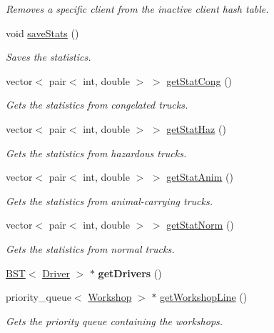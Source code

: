 \begin{DoxyCompactItemize}
\begin{DoxyCompactList}\small\item\em Removes a specific client from the inactive client hash table. \end{DoxyCompactList}\item 
void \hyperlink{class_company_aa5b12f509c71984f7346b14cff38ea50}{save\+Stats} ()
\begin{DoxyCompactList}\small\item\em Saves the statistics. \end{DoxyCompactList}\item 
vector$<$ pair$<$ int, double $>$ $>$ \hyperlink{class_company_a46ae11a39256db9dbf2941c58df579c5}{get\+Stat\+Cong} ()
\begin{DoxyCompactList}\small\item\em Gets the statistics from congelated trucks. \end{DoxyCompactList}\item 
vector$<$ pair$<$ int, double $>$ $>$ \hyperlink{class_company_aa37fd8b5214cc269f8f1a0d9b23d2c61}{get\+Stat\+Haz} ()
\begin{DoxyCompactList}\small\item\em Gets the statistics from hazardous trucks. \end{DoxyCompactList}\item 
vector$<$ pair$<$ int, double $>$ $>$ \hyperlink{class_company_af7e04162aac8a1057d2563e211e67460}{get\+Stat\+Anim} ()
\begin{DoxyCompactList}\small\item\em Gets the statistics from animal-\/carrying trucks. \end{DoxyCompactList}\item 
vector$<$ pair$<$ int, double $>$ $>$ \hyperlink{class_company_aec149faa3a58555957f83df920897253}{get\+Stat\+Norm} ()
\begin{DoxyCompactList}\small\item\em Gets the statistics from normal trucks. \end{DoxyCompactList}\item 
\mbox{\label{class_company_ac53325e1c17389979293dbc78398dc31}} 
\hyperlink{class_b_s_t}{B\+ST}$<$ \hyperlink{class_driver}{Driver} $>$ $\ast$ {\bfseries get\+Drivers} ()
\item 
priority\+\_\+queue$<$ \hyperlink{class_workshop}{Workshop} $>$ $\ast$ \hyperlink{class_company_a339f3025b003f464ffd058d5dbdf43e2}{get\+Workshop\+Line} ()
\begin{DoxyCompactList}\small\item\em Gets the priority queue containing the workshops. \end{DoxyCompactList}\end{DoxyCompactItemize}
